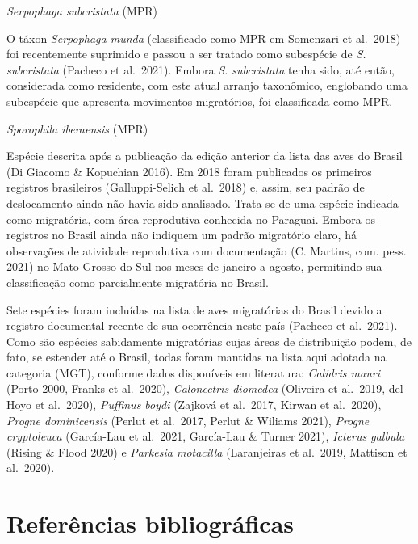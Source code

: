 \documentclass[
  oneside]{scrbook}
\begin{document}
\begin{blackbox}
\emph{Serpophaga subcristata} (MPR)

O táxon \emph{Serpophaga munda} (classificado como MPR em Somenzari et al.~2018) foi recentemente suprimido e passou a ser tratado como subespécie de \emph{S. subcristata} (Pacheco et al.~2021). Embora \emph{S. subcristata} tenha sido, até então, considerada como residente, com este atual arranjo taxonômico, englobando uma subespécie que apresenta movimentos migratórios, foi classificada como MPR.

\end{blackbox}

\begin{blackbox}
\emph{Sporophila iberaensis} (MPR)

Espécie descrita após a publicação da edição anterior da lista das aves do Brasil (Di Giacomo \& Kopuchian 2016). Em 2018 foram publicados os primeiros registros brasileiros (Galluppi-Selich et al.~2018) e, assim, seu padrão de deslocamento ainda não havia sido analisado. Trata-se de uma espécie indicada como migratória, com área reprodutiva conhecida no Paraguai. Embora os registros no Brasil ainda não indiquem um padrão migratório claro, há observações de atividade reprodutiva com documentação (C. Martins, com. pess. 2021) no Mato Grosso do Sul nos meses de janeiro a agosto, permitindo sua classificação como parcialmente migratória no Brasil.

\end{blackbox}

Sete espécies foram incluídas na lista de aves migratórias do Brasil devido a registro documental recente de sua ocorrência neste país (Pacheco et al.~2021). Como são espécies sabidamente migratórias cujas áreas de distribuição podem, de fato, se estender até o Brasil, todas foram mantidas na lista aqui adotada na categoria (MGT), conforme dados disponíveis em literatura: \emph{Calidris mauri} (Porto 2000, Franks et al.~2020), \emph{Calonectris diomedea} (Oliveira et al.~2019, del Hoyo et al.~2020), \emph{Puffinus boydi} (Zajková et al.~2017, Kirwan et al.~2020), \emph{Progne dominicensis} (Perlut et al.~2017, Perlut \& Wiliams 2021), \emph{Progne cryptoleuca} (García-Lau et al.~2021, García-Lau \& Turner 2021), \emph{Icterus galbula} (Rising \& Flood 2020) e \emph{Parkesia motacilla} (Laranjeiras et al.~2019, Mattison et al.~2020).

\hypertarget{referuxeancias-bibliogruxe1ficas-1}{%
\section{Referências bibliográficas}\label{referuxeancias-bibliogruxe1ficas-1}}
\end{document}
